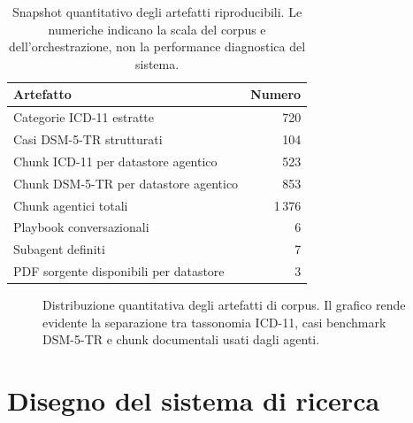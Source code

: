 \documentclass[11pt,a4paper]{article}
\begin{document}
\begin{table}[htbp]
\centering
\begin{tabular}{lr}
\toprule
\textbf{Artefatto} & \textbf{Numero}\\
\midrule
Categorie ICD-11 estratte & 720\\
Casi DSM-5-TR strutturati & 104\\
Chunk ICD-11 per datastore agentico & 523\\
Chunk DSM-5-TR per datastore agentico & 853\\
Chunk agentici totali & 1\,376\\
Playbook conversazionali & 6\\
Subagent definiti & 7\\
PDF sorgente disponibili per datastore & 3\\
\bottomrule
\end{tabular}
\caption{Snapshot quantitativo degli artefatti riproducibili. Le numeriche indicano la scala del corpus e dell'orchestrazione, non la performance diagnostica del sistema.}
\label{tab:repo-snapshot-it}
\end{table}

\begin{figure}[htbp]
\centering
{}
\caption{Distribuzione quantitativa degli artefatti di corpus. Il grafico rende evidente la separazione tra tassonomia ICD-11, casi benchmark DSM-5-TR e chunk documentali usati dagli agenti.}
\label{fig:repo-snapshot-chart-it}
\end{figure}

\section{Disegno del sistema di ricerca}
\end{document}
